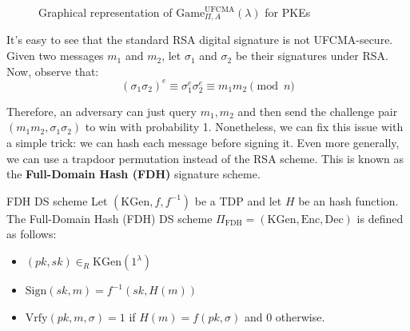 \documentclass[a4paper, 12pt]{report}
\begin{document}
    \begin{figure}[H]
        \centering


        \caption{Graphical representation of $\mathrm{Game}^{\text{UFCMA}}_{\Pi, A}(\lambda)$ for PKEs}
    \end{figure}
    
    It's easy to see that the standard RSA digital signature is not UFCMA-secure. Given two messages $m_1$ and $m_2$, let $\sigma_1$ and $\sigma_2$ be their signatures under RSA. Now, observe that:
    \[(\sigma_1 \sigma_2)^e \equiv \sigma_1^e \sigma_2^e \equiv m_1 m_2 \pmod n \]
    
    Therefore, an adversary can just query $m_1, m_2$ and then send the challenge pair $(m_1m_2, \sigma_1\sigma_2)$ to win with probability 1. Nonetheless, we can fix this issue with a simple trick: we can hash each message before signing it. Even more generally, we can use a trapdoor permutation instead of the RSA scheme. This is known as the \textbf{Full-Domain Hash (FDH)} signature scheme.

    \begin{framedalgo}{FDH DS scheme}
        Let $(\mathrm{KGen}, f, f^{-1})$ be a TDP and let $H$ be an hash function. The Full-Domain Hash (FDH) DS scheme $\Pi_{\text{FDH}} = (\mathrm{KGen}, \mathrm{Enc}, \mathrm{Dec})$ is defined as follows:
        \begin{itemize}
            \item $(pk, sk) \in_R \mathrm{KGen}(1^{\lambda})$
            \item $\mathrm{Sign}(sk, m) = f^{-1}(sk, H(m))$
            \item $\mathrm{Vrfy}(pk, m, \sigma) = 1$ if $H(m) = f(pk, \sigma)$ and $0$ otherwise.
        \end{itemize}
    \end{framedalgo}
\end{document}
